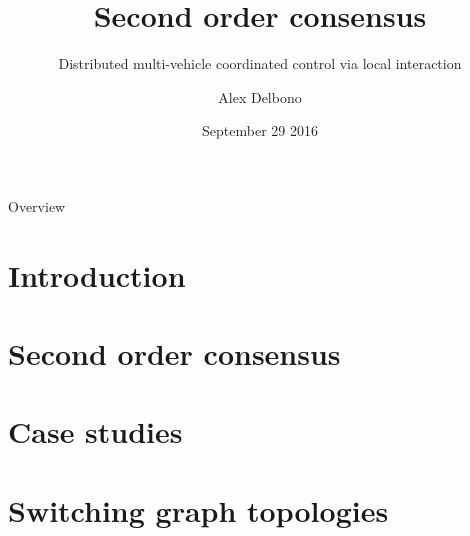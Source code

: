 \documentclass{beamer}
\title[Second order consensus]{\textbf{Second order consensus}}
\subtitle{Distributed multi-vehicle coordinated control via local interaction}
\author[Alex Delbono]{Alex Delbono \\ }
\institute[Politecnico di Milano]{\href{mailto:alex.delbono@mail.polimi.it}{alex.delbono@mail.polimi.it}  
		\newline 
		Politecnico di Milano}
\date{September 29 2016}
\begin{document}
\begin{frame}
  \titlepage
\end{frame}

\begin{frame}{Overview}
\tableofcontents
\end{frame}


\section{Introduction}
\label{sec:introduction}


\section{Second order consensus}
\label{sec:second_order_consensus}


\section{Case studies}
\label{sec:case_studies}




\section{Switching graph topologies}
\label{sec:switching_graph_topologies}


%

\end{document}

